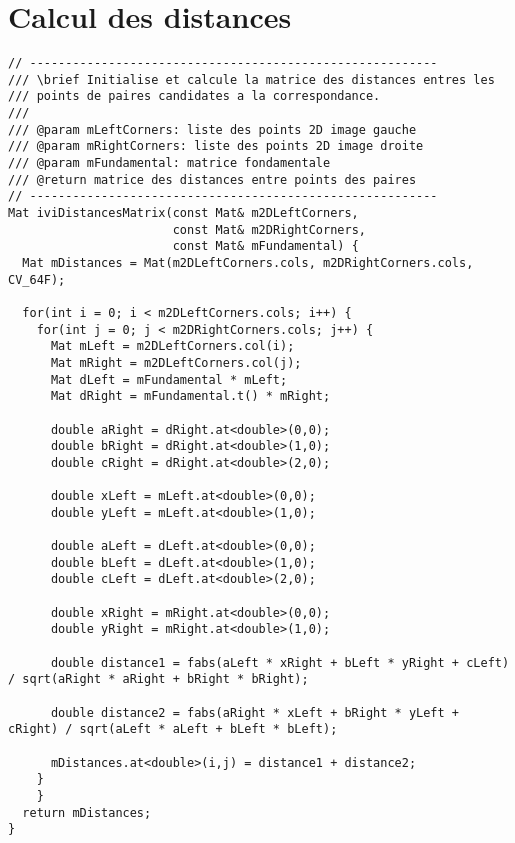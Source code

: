 \documentclass[a4paper]{article}
\begin{document}
\section{Calcul des distances}

\begin{lstlisting}
// ---------------------------------------------------------
/// \brief Initialise et calcule la matrice des distances entres les
/// points de paires candidates a la correspondance.
///
/// @param mLeftCorners: liste des points 2D image gauche
/// @param mRightCorners: liste des points 2D image droite
/// @param mFundamental: matrice fondamentale
/// @return matrice des distances entre points des paires
// ---------------------------------------------------------
Mat iviDistancesMatrix(const Mat& m2DLeftCorners,
                       const Mat& m2DRightCorners,
                       const Mat& mFundamental) {
  Mat mDistances = Mat(m2DLeftCorners.cols, m2DRightCorners.cols, CV_64F);

  for(int i = 0; i < m2DLeftCorners.cols; i++) {
    for(int j = 0; j < m2DRightCorners.cols; j++) {
      Mat mLeft = m2DLeftCorners.col(i);
      Mat mRight = m2DLeftCorners.col(j);
      Mat dLeft = mFundamental * mLeft;
      Mat dRight = mFundamental.t() * mRight;

      double aRight = dRight.at<double>(0,0);
      double bRight = dRight.at<double>(1,0);
      double cRight = dRight.at<double>(2,0);

      double xLeft = mLeft.at<double>(0,0);
      double yLeft = mLeft.at<double>(1,0);

      double aLeft = dLeft.at<double>(0,0);
      double bLeft = dLeft.at<double>(1,0);
      double cLeft = dLeft.at<double>(2,0);

      double xRight = mRight.at<double>(0,0);
      double yRight = mRight.at<double>(1,0);

      double distance1 = fabs(aLeft * xRight + bLeft * yRight + cLeft) / sqrt(aRight * aRight + bRight * bRight);

      double distance2 = fabs(aRight * xLeft + bRight * yLeft + cRight) / sqrt(aLeft * aLeft + bLeft * bLeft);

      mDistances.at<double>(i,j) = distance1 + distance2;
    }
    }
  return mDistances;
}
\end{lstlisting}

\clearpage
\end{document}
